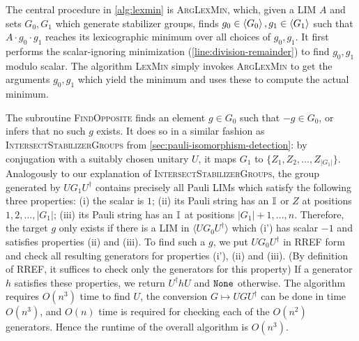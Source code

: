 The central procedure in \autoref{alg:lexmin} is \textsc{ArgLexMin}, which, given a LIM $A$ and sets $G_0,G_1$ which generate stabilizer groups, finds $g_0\in \braket{G_0},g_1\in\braket{G_1}$ such that $A\cdot g_0\cdot g_1$ reaches its lexicographic minimum over all choices of $g_0,g_1$.
It first performs the scalar-ignoring minimization (\autoref{line:division-remainder}) to find $g_0,g_1$ modulo scalar.
The algorithm \textsc{LexMin} simply invokes \textsc{ArgLexMin} to get the arguments $g_0, g_1$ which yield the minimum and uses these to compute the actual minimum.

The subroutine \textsc{FindOpposite} finds an element $g \in G_0$ such that $-g \in G_0$, or infers that no such $g$ exists.
It does so in a similar fashion as \textsc{IntersectStabilizerGroups} from \autoref{sec:pauli-isomorphism-detection}: by conjugation with a suitably chosen unitary $U$, it maps $G_1$ to $\{Z_1, Z_2, \dots, Z_{|G_1|}\}$.
Analogously to our explanation of \textsc{IntersectStabilizerGroups}, the group generated by $UG_1 U^{\dagger}$ contains precisely all Pauli LIMs which satisfy the following three properties:
(i) the scalar is $1$;
(ii) its Pauli string has an $\mathbb{I}_{}$ or $Z$ at positions $1, 2, \dots, |G_1|$;
(iii) its Pauli string has an $\mathbb{I}_{}$ at positions $|G_1|+1, \dots, n$.
Therefore, the target $g$ only exists if there is a LIM in $\langle U G_0 U^{\dagger}\rangle$ which (i') has scalar $-1$ and satisfies properties (ii) and (iii).
To find such a $g$, we put $UG_0 U^{\dagger}$ in RREF form and check all resulting generators for properties (i'), (ii) and (iii).
(By definition of RREF, it suffices to check only the generators for this property)
If a generator $h$ satisfies these properties, we return $U^{\dagger} h U$ and ${\tt None}$ otherwise.
The algorithm requires $O(n^3)$ time to find $U$, the conversion $G \mapsto UGU^{\dagger}$ can be done in time $O(n^3)$, and $O(n)$ time is required for checking each of the $O(n^2)$ generators.
Hence the runtime of the overall algorithm is $O(n^3)$.



